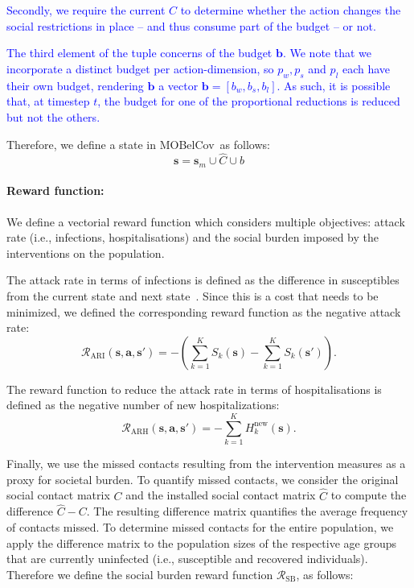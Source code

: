\documentclass{article}
\renewcommand{\cite}[1]{\citep{#1}}
\newcommand\added[1]{\textcolor{blue}{#1}}
\newcommand{\mdprewardfn}{\mathcal{R}}
\newcommand{\mdpstate}{\mathbf{s}}
\newcommand{\mdpaction}{\mathbf{a}}
\newcommand{\momdpname}{MOBelCov}
\newcommand{\agegroups}{K}
\newcommand{\budget}{\bm{b}}
\begin{document}
\added{Secondly, we require the current $\hat{C}$ to determine whether the action changes the social restrictions in place -- and thus consume part of the budget -- or not.}

\added{The third element of the tuple concerns of the budget $\budget$. We note that we incorporate a distinct budget per action-dimension, so $p_{w}, p_{s}$ and $p_{l}$ each have their own budget, rendering $\budget$ a vector $\budget = [b_w, b_s, b_l]$. As such, it is possible that, at timestep $t$, the budget for one of the proportional reductions is reduced but not the others.}

Therefore, we define a state in \momdpname\ as follows:
\begin{equation}
    \mdpstate = \mdpstate_m \cup \hat{C} \cup b
\end{equation}

\paragraph{Reward function:} We define a vectorial reward function which considers multiple objectives: attack rate (i.e., infections, hospitalisations) and the social burden imposed by the interventions on the population.

The attack rate in terms of infections is defined as the difference in susceptibles from the current state and next state~\cite{libin2020}. Since this is a cost that needs to be minimized, we defined the corresponding reward function as the negative attack rate:
\begin{equation}
\mdprewardfn_{\text{ARI}}(\mdpstate,\mdpaction,\mdpstate') = -(\sum_{k=1}^{\agegroups}S_k(\mdpstate)-\sum_{k=1}^{\agegroups}S_k(\mdpstate')).
\end{equation}

The reward function to reduce the attack rate in terms of hospitalisations is defined as the negative number of new hospitalizations:
\begin{equation}
\mdprewardfn_{\text{ARH}}(\mdpstate,\mdpaction,\mdpstate') = -\sum_{k=1}^{\agegroups}H^\text{new}_k(\mdpstate).
\label{eqn:attack-rate-hosp}
\end{equation}

Finally, we use the missed contacts resulting from the intervention measures as a proxy for societal burden. To quantify missed contacts, we consider the original social contact matrix $C$ and the installed social contact matrix $\hat{C}$ to compute the difference $\hat{C} - C$. 
The resulting difference matrix quantifies the average frequency of contacts missed. To determine missed contacts for the entire population, we apply the difference matrix to the population sizes of the respective age groups that are currently uninfected (i.e., susceptible and recovered individuals). Therefore we define the social burden reward function $\mdprewardfn_{\text{SB}}$, as follows:
\end{document}
